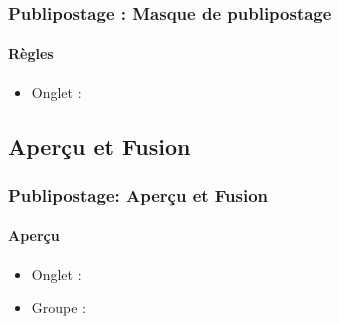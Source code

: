 \documentclass[xcolor=table]{beamer}
\begin{document}
\begin{frame}
\frametitle{Publipostage : Masque de publipostage}
\framesubtitle{Règles}

\begin{minipage}{0.63\textwidth}
	\begin{itemize}
		\item Onglet : 
	\end{itemize}
\end{minipage}
\begin{minipage}{0.36\textwidth}
	
\end{minipage}

\end{frame}

\subsection{Aperçu et Fusion}

\begin{frame}
\frametitle{Publipostage: Aperçu et Fusion}
\framesubtitle{Aperçu}

\begin{minipage}{0.63\textwidth}
	\begin{itemize}
		\item Onglet : 
		\item Groupe : 
	\end{itemize}
\end{minipage}
\begin{minipage}{0.36\textwidth}
	
\end{minipage}

\end{frame}
\end{document}
